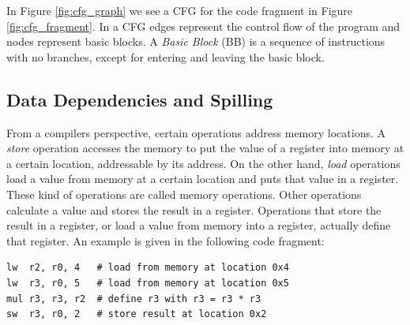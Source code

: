 In Figure \ref{fig:cfg_graph} we see a CFG for the code fragment in Figure \ref{fig:cfg_fragment}. In a CFG edges represent the control flow of the program and nodes represent basic blocks. A \emph{Basic Block} (BB) is a sequence of instructions with no branches, except for entering and leaving the basic block.
\\



\subsection{Data Dependencies and Spilling}\label{sec:data_dependencies}
From a compilers perspective, certain operations address memory locations. A \emph{store} operation accesses the memory to put the value of a register into memory at a certain location, addressable by its address. On the other hand, \emph{load} operations load a value from memory at a certain location and puts that value in a register. These kind of operations are called memory operations. Other operations calculate a value and stores the result in a register. Operations that store the result in a register, or load a value from memory into a register, actually define that register. An example is given in the following code fragment:

\begin{lstlisting}
lw  r2, r0, 4   # load from memory at location 0x4
lw  r3, r0, 5   # load from memory at location 0x5
mul r3, r3, r2  # define r3 with r3 = r3 * r3
sw  r3, r0, 2   # store result at location 0x2
\end{lstlisting}

